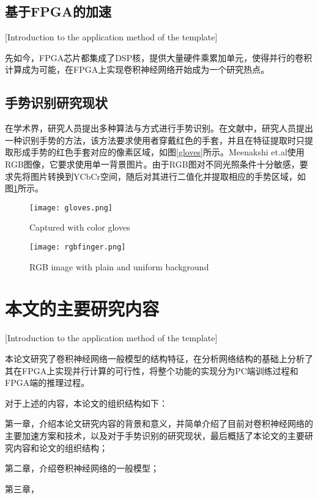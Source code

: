 \subsection{基于FPGA的加速}[Introduction to the application method of the template]

先如今，FPGA芯片都集成了DSP核，提供大量硬件乘累加单元，使得并行的卷积计算成为可能，在FPGA上实现卷积神经网络开始成为一个研究热点。




\subsection{手势识别研究现状}
在学术界，研究人员提出多种算法与方式进行手势识别。在文献\cite{agrawal2011tutor}中，研究人员提出一种识别手势的方法，该方法要求使用者穿戴红色的手套，并且在特征提取时只提取形成手势的红色手套对应的像素区域，如图\ref{gloves}所示。Meenakshi et.al\cite{panwar2011hand}使用RGB图像，它要求使用单一背景图片。由于RGB图对不同光照条件十分敏感，要求先将图片转换到YCbCr空间，随后对其进行二值化并提取相应的手势区域，如图\ref{rgbfinger}所示。

\begin{figure}[h]
\begin{minipage}{0.4\linewidth}
\centering
\texttt{[image: gloves.png]}
\caption{Captured with color gloves}
\label{gloves}
\end{minipage}
\begin{minipage}{0.6\linewidth}
\centering
\texttt{[image: rgbfinger.png]}
\caption{RGB image with plain and uniform background}
\label{rgbfinger}
\end{minipage}
\end{figure}



\section{本文的主要研究内容}[Introduction to the application method of the template]

本论文研究了卷积神经网络一般模型的结构特征，在分析网络结构的基础上分析了其在FPGA上实现并行计算的可行性，将整个功能的实现分为PC端训练过程和FPGA端的推理过程。

对于上述的内容，本论文的组织结构如下：

第一章，介绍本论文研究内容的背景和意义，并简单介绍了目前对卷积神经网络的主要加速方案和技术，以及对于手势识别的研究现状，最后概括了本论文的主要研究内容和论文的组织结构；

第二章，介绍卷积神经网络的一般模型；

第三章，
